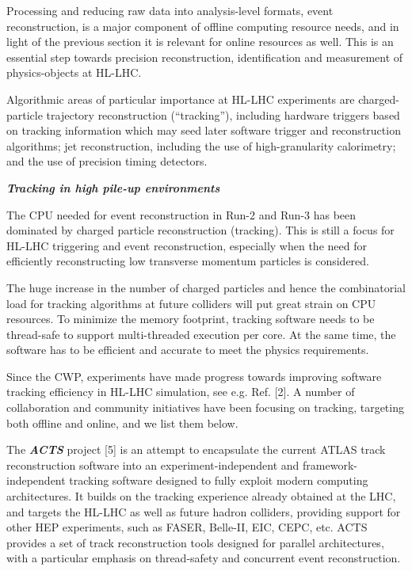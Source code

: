 \documentclass[11pt,a4paper]{article}
\begin{document}
Processing and reducing raw data into analysis-level formats, event
reconstruction, is a major component of offline computing resource
needs, and in light of the previous section it is relevant for online
resources as well. This is an essential step towards precision
reconstruction, identification and measurement of physics-objects at
HL-LHC.

Algorithmic areas of particular importance at HL-LHC experiments are
charged-particle trajectory reconstruction (``tracking''), including
hardware triggers based on tracking information which may seed later
software trigger and reconstruction algorithms; jet reconstruction,
including the use of high-granularity calorimetry; and the use of
precision timing detectors.

\emph{\textbf{Tracking in high pile-up environments}}

The CPU needed for event reconstruction in Run-2 and Run-3 has been
dominated by charged particle reconstruction (tracking). This is still a
focus for HL-LHC triggering and event reconstruction, especially when
the need for efficiently reconstructing low transverse momentum
particles is considered.

The huge increase in the number of charged particles and hence the
combinatorial load for tracking algorithms at future colliders will put
great strain on CPU resources. To minimize the memory footprint,
tracking software needs to be thread-safe to support multi-threaded
execution per core. At the same time, the software has to be efficient
and accurate to meet the physics requirements.

Since the CWP, experiments have made progress towards improving software
tracking efficiency in HL-LHC simulation, see e.g. Ref. {[}2{]}. A
number of collaboration and community initiatives have been focusing on
tracking, targeting both offline and online, and we list them below.

The \emph{\textbf{ACTS}} project {[}5{]} is an attempt to encapsulate
the current ATLAS track reconstruction software into an
experiment-independent and framework-independent tracking software
designed to fully exploit modern computing architectures. It builds on
the tracking experience already obtained at the LHC, and targets the
HL-LHC as well as future hadron colliders, providing support for other
HEP experiments, such as FASER, Belle-II, EIC, CEPC, etc. ACTS provides
a set of track reconstruction tools designed for parallel architectures,
with a particular emphasis on thread-safety and concurrent event
reconstruction.
\end{document}
